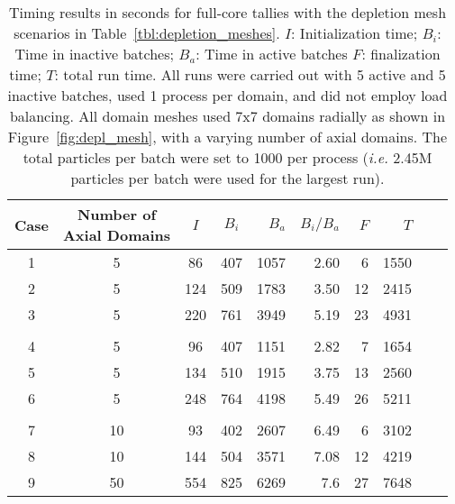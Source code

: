 \documentclass[12pt,twoside]{mitthesis-exec}
\begin{document}
\begin{table}
  \begin{center}
    \caption[OTF tally timing results for terabyte tally BEAVRS
    runs]{Timing results in seconds for full-core tallies with the depletion
    mesh scenarios in Table~\ref{tbl:depletion_meshes}. $I$: Initialization
    time; $B_i$: Time in inactive batches; $B_a$: Time in active batches $F$:
    finalization time; $T$: total run time. All runs were carried out with 5
    active and 5 inactive batches, used 1 process per domain, and did not employ
    load balancing. All domain meshes used 7x7 domains radially as shown in
    Figure~\ref{fig:depl_mesh}, with a varying number of axial domains. The
    total particles per batch were set to 1000 per process (\emph{i.e.} 2.45M
    particles per batch were used for the largest run).
    \label{tbl:depletion_tallies}}
    \begin{tabular}{ccccrrrrrr}
    \toprule
    Case & \pbox{20cm}{Number of \\ Axial Domains} & $I$ & $B_i$ & $B_a$ & $B_i/B_a$ & $F$ & $T$ \\
    \midrule
1 & 5 & 86 & 407 & 1057 & 2.60 & 6 & 1550 \\
2 & 5 & 124 & 509 & 1783 & 3.50 & 12 & 2415 \\
3 & 5 & 220 & 761 & 3949 & 5.19 & 23 & 4931 \\  
 & & & & & & & \\
4 & 5 & 96 & 407 & 1151 & 2.82 & 7 & 1654 \\
5 & 5 & 134 & 510 & 1915 & 3.75 & 13 & 2560 \\
6 & 5 & 248 & 764 & 4198 & 5.49 & 26 & 5211 \\
 & & & & & & & \\
7 & 10 & 93 & 402 & 2607 & 6.49 & 6 & 3102 \\
8 & 10 & 144 & 504 & 3571 & 7.08 & 12 & 4219 \\
9 & 50 & 554 & 825 & 6269 & 7.6 & 27 & 7648 \\
    \bottomrule
    \end{tabular}
  \end{center}
\end{table}

\end{document}

